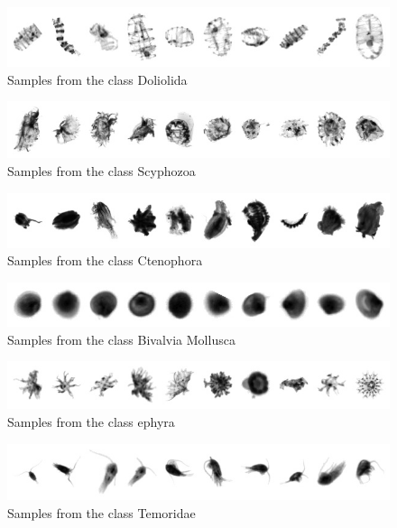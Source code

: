 \begin{figure}[h]
\includegraphics[width=\columnwidth]{collage/022_Doliolida.jpg}\caption{Samples from the class Doliolida }
\end{figure}
\begin{figure}[h]
\includegraphics[width=\columnwidth]{collage/023_Scyphozoa.jpg}\caption{Samples from the class Scyphozoa }
\end{figure}
\begin{figure}[h]
\includegraphics[width=\columnwidth]{collage/024_Ctenophora.jpg}\caption{Samples from the class Ctenophora }
\end{figure}
\begin{figure}[h]
\includegraphics[width=\columnwidth]{collage/025_Bivalvia__Mollusca.jpg}\caption{Samples from the class Bivalvia  Mollusca }
\end{figure}
\begin{figure}[h]
\includegraphics[width=\columnwidth]{collage/026_ephyra.jpg}\caption{Samples from the class ephyra }
\end{figure}
\begin{figure}[h]
\includegraphics[width=\columnwidth]{collage/027_Temoridae.jpg}\caption{Samples from the class Temoridae }
\end{figure}
